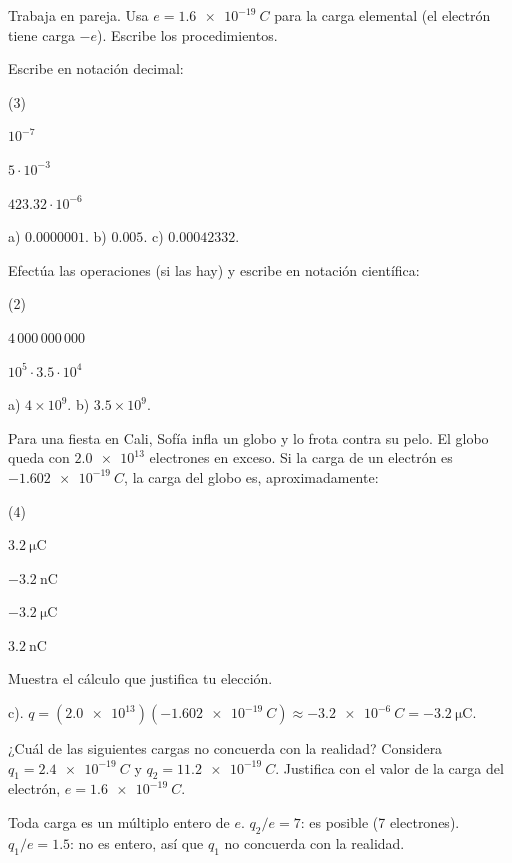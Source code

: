 \documentclass[11pt]{article}
\begin{document}
\encabezado

\begin{instrucciones}
Trabaja en pareja. Usa $e = \qty{1,6e-19}{C}$ para la carga elemental (el electrón tiene
carga $-e$). Escribe los procedimientos.
\end{instrucciones}

\begin{preguntas}

\pregunta[1] Escribe en notación decimal:
\begin{opciones*}(3)
  \item $10^{-7}$
  \item $5 \cdot 10^{-3}$
  \item $\num{423,32} \cdot 10^{-6}$
\end{opciones*}
\begin{solucion}[1.2cm]
a) $\num{0,0000001}$. b) $\num{0,005}$. c) $\num{0,00042332}$.
\end{solucion}

\pregunta[1] Efectúa las operaciones (si las hay) y escribe en notación científica:
\begin{opciones*}(2)
  \item $4\,000\,000\,000$
  \item $10^{5} \cdot \num{3,5} \cdot 10^{4}$
\end{opciones*}
\begin{solucion}[1.2cm]
a) $4 \times 10^{9}$. b) $\num{3,5} \times 10^{9}$.
\end{solucion}

\pregunta[1.5] Para una fiesta en Cali, Sofía infla un globo y lo frota contra su pelo. El
globo queda con $\num{2,0e13}$ electrones en exceso. Si la carga de un electrón es
$\qty{-1,602e-19}{C}$, la carga del globo es, aproximadamente:
\begin{opciones*}(4)
  \item $\qty{3,2}{\micro\coulomb}$
  \item $\qty{-3,2}{\nano\coulomb}$
  \item $\qty{-3,2}{\micro\coulomb}$
  \item $\qty{3,2}{\nano\coulomb}$
\end{opciones*}
Muestra el cálculo que justifica tu elección.
\begin{solucion}[2.5cm]
c). $q = (\num{2,0e13})(\qty{-1,602e-19}{C}) \approx \qty{-3,2e-6}{C} =
\qty{-3,2}{\micro\coulomb}$.
\end{solucion}

\pregunta[1.5] ¿Cuál de las siguientes cargas no concuerda con la realidad? Considera
$q_1 = \qty{2,4e-19}{C}$ y $q_2 = \qty{11,2e-19}{C}$. Justifica con el valor de la carga del
electrón, $e = \qty{1,6e-19}{C}$.
\begin{solucion}[2.5cm]
Toda carga es un múltiplo entero de $e$. $q_2/e = 7$: es posible (7 electrones).
$q_1/e = \num{1,5}$: no es entero, así que $q_1$ no concuerda con la realidad.
\end{solucion}

\end{preguntas}
\end{document}
